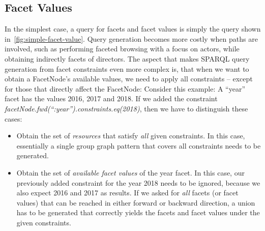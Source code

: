 \subsection{Facet Values}
In the simplest case, a query for facets and facet values is simply the query shown in~\autoref{fig:simple-facet-value}.
Query generation becomes more costly when paths are involved, such as
performing faceted browsing with a focus on actors, while obtaining indirectly facets of directors.
The aspect that makes SPARQL query generation from facet constraints even more complex is, that when we want to obtain a FacetNode's available values, we need to apply all constraints -- except for those that directly affect the FacetNode:
Consider this example: A ``year'' facet has the values 2016, 2017 and 2018. If we added the constraint \emph{facetNode.fwd(``:year'').constraints.eq(2018)}, then we have to distinguish these cases:
\begin{itemize}
\item Obtain the set of \emph{resources} that satisfy \emph{all} given constraints.
In this case, essentially a single group graph pattern that covers all constraints needs to be generated.  
\item Obtain the set of \emph{available facet values} of the year facet.
In this case, our previously added constraint for the year 2018 needs to be ignored,
because we also expect 2016 and 2017 as results.
If we asked for \emph{all} facets (or facet values) that can be reached in either forward or backward direction,
a union has to be generated that correctly yields the facets and facet values under the given constraints.
\end{itemize}







